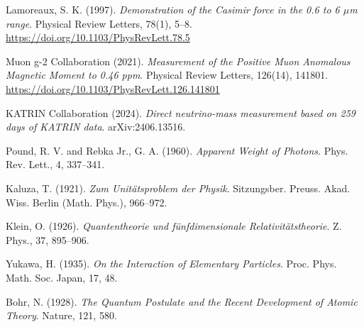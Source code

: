 \documentclass[12pt,a4paper]{article}
\theoremstyle{definition}
\begin{document}
\begin{thebibliography}{99}
	Lamoreaux, S. K. (1997). 
	\textit{Demonstration of the Casimir force in the 0.6 to 6 $\mu$m range}. 
	Physical Review Letters, 78(1), 5--8. 
	\url{https://doi.org/10.1103/PhysRevLett.78.5}
	
	Muon g-2 Collaboration (2021). 
	\textit{Measurement of the Positive Muon Anomalous Magnetic Moment to 0.46 ppm}. 
	Physical Review Letters, 126(14), 141801. 
	\url{https://doi.org/10.1103/PhysRevLett.126.141801}
	
	KATRIN Collaboration (2024). 
	\textit{Direct neutrino-mass measurement based on 259 days of KATRIN data}. 
	arXiv:2406.13516.
	
	Pound, R. V. and Rebka Jr., G. A. (1960).
	\textit{Apparent Weight of Photons}.
	Phys. Rev. Lett., 4, 337--341.
	
	Kaluza, T. (1921).
	\textit{Zum Unitätsproblem der Physik}.
	Sitzungsber. Preuss. Akad. Wiss. Berlin (Math. Phys.), 966--972.
	
	Klein, O. (1926).
	\textit{Quantentheorie und fünfdimensionale Relativitätstheorie}.
	Z. Phys., 37, 895--906.
	
	Yukawa, H. (1935).
	\textit{On the Interaction of Elementary Particles}.
	Proc. Phys. Math. Soc. Japan, 17, 48.
	
	Bohr, N. (1928).
	\textit{The Quantum Postulate and the Recent Development of Atomic Theory}.
	Nature, 121, 580.
	
\end{thebibliography}
\end{document}
